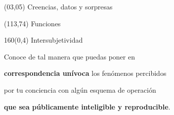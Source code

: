 \documentclass[shownotes,aspectratio=169]{beamer}
\begin{document}
\color{black!85}
\large

 

\begin{frame}
 
 \begin{textblock}{90}(03,05)
 \centering \huge  \textcolor{black!40}{Creencias, datos y sorpresas}
\end{textblock}

 \begin{textblock}{47}(113,74)
\centering \Large  \textcolor{white!55}{Funciones}
\end{textblock}

{}
\end{frame}

\begin{frame}[plain]
\begin{textblock}{160}(0,4)
 \centering \LARGE Intersubjetividad
\end{textblock}
\vspace{0.75cm}

 \begin{mdframed}[backgroundcolor=black!20]
 \centering
  Conoce de tal manera que puedas poner en
  
\textbf{correspondencia un\'ivoca} los fenómenos percibidos

por tu conciencia con algún esquema de operación

\textbf{que sea públicamente inteligible y reproducible}.
 \end{mdframed}

\end{frame}
\end{document}
